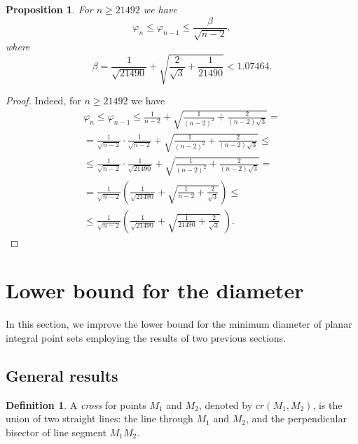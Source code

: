 \documentclass[a4paper,14pt]{article} %
\theoremstyle{plain}
\newtheorem{proposition}[theorem]{Proposition}
\theoremstyle{definition}
\newtheorem{definition}[theorem]{Definition}
\begin{document}
\begin{proposition}
	\label{varphi_n_where_n_geq_21492}
	For $n \geq 21492$ we have
	\begin{equation}
		\varphi_n \leq \varphi_{n-1} \leq \frac{\beta}{\sqrt{n-2}}
		,
	\end{equation}
	where
	\begin{equation}
		\beta = \frac{1}{\sqrt{21490}} + \sqrt{ \frac{2}{\sqrt{3}} + \frac{1}{21490} } < 1.07464
		.
	\end{equation}
\end{proposition}

\begin{proof}
	Indeed, for $n \geq 21492$ we have
	\begin{multline*}
		\varphi_n
		\leq
		\varphi_{n-1}
		\leq
		\frac{1}{n-2} +
		\sqrt{
			\frac{1}{(n-2)^2}
			+
			\frac{2}{(n-2)\sqrt{3}}
		}
		=
		\\=
		\frac{1}{\sqrt{n-2}}
		\cdot
		\frac{1}{\sqrt{n-2}}
		 +
		\sqrt{
			\frac{1}{(n-2)^2}
			+
			\frac{2}{(n-2)\sqrt{3}}
		}
		\leq
		\\ \leq
		\frac{1}{\sqrt{n-2}}
		\cdot
		\frac{1}{\sqrt{21490}}
		 +
		\sqrt{
			\frac{1}{(n-2)^2}
			+
			\frac{2}{(n-2)\sqrt{3}}
		}
		=
		\\=
		\frac{1}{\sqrt{n-2}}
		\left(
		\frac{1}{\sqrt{21490}}
		 +
		\sqrt{
			\frac{1}{n-2}
			+
			\frac{2}{\sqrt{3}}
		}
		\right)
		\leq
		\\ \leq
		\frac{1}{\sqrt{n-2}}
		\left(
		\frac{1}{\sqrt{21490}}
		 +
		\sqrt{
			\frac{1}{21490}
			+
			\frac{2}{\sqrt{3}}
		}
		\;
		\right)
		.
	\end{multline*}
\end{proof}

\section{Lower bound for the diameter}

In this section,
we improve the lower bound for the minimum diameter of planar integral point sets
employing the results of two previous sections.

\subsection{General results}

\begin{definition}
	A \textit{cross} for points $M_1$ and $M_2$, denoted by $cr(M_1,M_2)$, is the union of two straight lines:
	the line through $M_1$ and $M_2$,
	and the perpendicular bisector of line segment $M_1 M_2$.
\end{definition}
\end{document}
